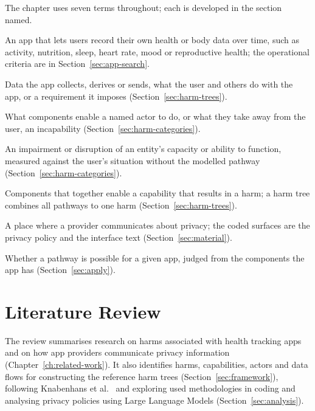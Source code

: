 The chapter uses seven terms throughout; each is developed in the section named.
\begin{description}[leftmargin=1.5em,itemsep=1pt,topsep=3pt,
                    labelindent=0pt,font=\normalfont\bfseries]
  \item[Health tracker] An app that lets users record their own health or body data over
    time, such as activity, nutrition, sleep, heart rate, mood or reproductive health; the
    operational criteria are in Section~\ref{sec:app-search}.
  \item[System component] Data the app collects, derives or sends, what the user and others do
    with the app, or a requirement it imposes (Section~\ref{sec:harm-trees}).
  \item[Capability] What components enable a named actor to do, or what they take away from the
    user, an incapability (Section~\ref{sec:harm-categories}).
  \item[Harm] An impairment or disruption of an entity's capacity or ability to function,
    measured against the user's situation without the modelled pathway
    (Section~\ref{sec:harm-categories}).
  \item[Pathway to harm] Components that together enable a capability that results in a harm;
    a harm tree combines all pathways to one harm (Section~\ref{sec:harm-trees}).
  \item[Surface] A place where a provider communicates about privacy; the coded surfaces are
    the privacy policy and the interface text (Section~\ref{sec:material}).
  \item[Applicability] Whether a pathway is possible for a given app, judged from the
    components the app has (Section~\ref{sec:apply}).
\end{description}

\section{Literature Review}
\label{sec:lit-review}

The review summarises research on harms associated
with health tracking apps and on how app providers communicate privacy information
(Chapter~\ref{ch:related-work}). It also identifies harms, capabilities, actors and data flows
for constructing the reference harm trees (Section~\ref{sec:framework}), following
Knabenhans et al.~\parencite{knabenhans2026harms} and exploring used methodologies in
coding and analysing privacy policies using Large Language Models (Section~\ref{sec:analysis}).

